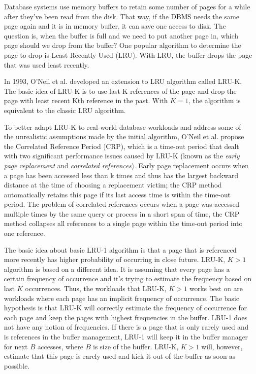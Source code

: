 Database systems use memory buffers to retain some number of pages for a while after they've been read from the disk. That way, if the DBMS needs the same page again and it is in memory buffer, it can save one access to disk. The question is, when the buffer is full and we need to put another page in, which page should we drop from the buffer? One popular algorithm to determine the page to drop is Least Recently Used (LRU). With LRU, the buffer drops the page that was used least recently.

In 1993, O'Neil et al. \cite{lruk} developed an extension to LRU algorithm called LRU-K. The basic idea of LRU-K is to use last K references of the page and drop the page with least recent Kth reference in the past. With $K = 1$, the algorithm is equivalent to the classic LRU algorithm.

To better adapt LRU-K to real-world database workloads and address some of the unrealistic assumptions made by the initial algorithm, O'Neil et al. propose the Correlated Reference Period (CRP), which is a time-out period that dealt with two significant performance issues caused by LRU-K (known as the \emph{early page replacement} and \emph{correlated references}). Early page replacement occurs when a page has been accessed less than k times and thus has the largest backward distance at the time of choosing a replacement victim; the CRP method automatically retains this page if its last access time is within the time-out period. The problem of correlated references occurs when a page was accessed multiple times by the same query or process in a short span of time, the CRP method collapses all references to a single page within the time-out period into one reference.

The basic idea about basic LRU-1 algorithm is that a page that is referenced more recently has higher probability of occurring in close future. LRU-K, $K > 1$ algorithm is based on a different idea. It is assuming that every page has a certain frequency of occurrence and it's trying to estimate the frequency based on last $K$ occurrences. Thus, the workloads that LRU-K, $K > 1$ works best on are workloads where each page has an implicit frequency of occurrence. The basic hypothesis is that LRU-K will correctly estimate the frequency of occurrence for each page and keep the pages with highest frequencies in the buffer. LRU-1 does not have any notion of frequencies. If there is a page that is only rarely used and is references in the buffer management, LRU-1 will keep it in the buffer manager for next $B$ accesses, where $B$ is size of the buffer. LRU-K, $K > 1$ will, however, estimate that this page is rarely used and kick it out of the buffer as soon as possible.

